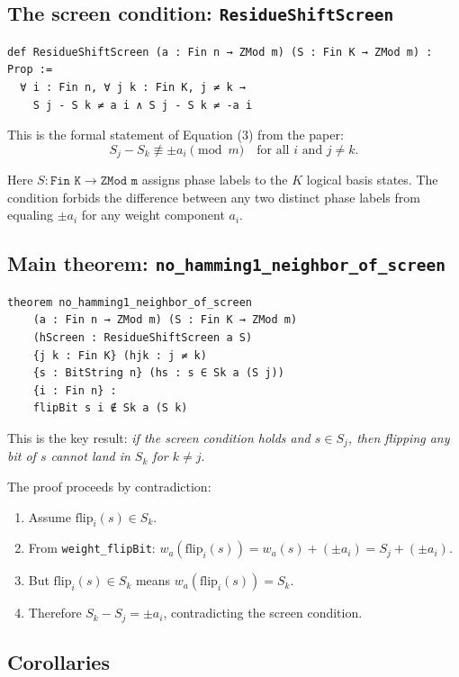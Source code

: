 \documentclass[11pt]{article}
\begin{document}
\subsection*{The screen condition: \texttt{ResidueShiftScreen}}

\begin{lstlisting}
def ResidueShiftScreen (a : Fin n → ZMod m) (S : Fin K → ZMod m) : Prop :=
  ∀ i : Fin n, ∀ j k : Fin K, j ≠ k →
    S j - S k ≠ a i ∧ S j - S k ≠ -a i
\end{lstlisting}

This is the formal statement of Equation (3) from the paper:
\[
S_j - S_k \not\equiv \pm a_i \pmod{m} \quad \text{for all } i \text{ and } j \neq k.
\]

Here $S : \texttt{Fin K} \to \texttt{ZMod m}$ assigns phase labels to the $K$ logical basis states.
The condition forbids the difference between any two distinct phase labels from equaling $\pm a_i$ for any weight component $a_i$.

\subsection*{Main theorem: \texttt{no\_hamming1\_neighbor\_of\_screen}}

\begin{lstlisting}
theorem no_hamming1_neighbor_of_screen
    (a : Fin n → ZMod m) (S : Fin K → ZMod m)
    (hScreen : ResidueShiftScreen a S)
    {j k : Fin K} (hjk : j ≠ k)
    {s : BitString n} (hs : s ∈ Sk a (S j))
    {i : Fin n} :
    flipBit s i ∉ Sk a (S k)
\end{lstlisting}

This is the key result: \emph{if the screen condition holds and $s \in S_j$, then flipping any bit of $s$ cannot land in $S_k$ for $k \neq j$}.

The proof proceeds by contradiction:
\begin{enumerate}
\item Assume $\text{flip}_i(s) \in S_k$.
\item From \texttt{weight\_flipBit}: $w_a(\text{flip}_i(s)) = w_a(s) + (\pm a_i) = S_j + (\pm a_i)$.
\item But $\text{flip}_i(s) \in S_k$ means $w_a(\text{flip}_i(s)) = S_k$.
\item Therefore $S_k - S_j = \pm a_i$, contradicting the screen condition.
\end{enumerate}

\subsection*{Corollaries}
\end{document}

